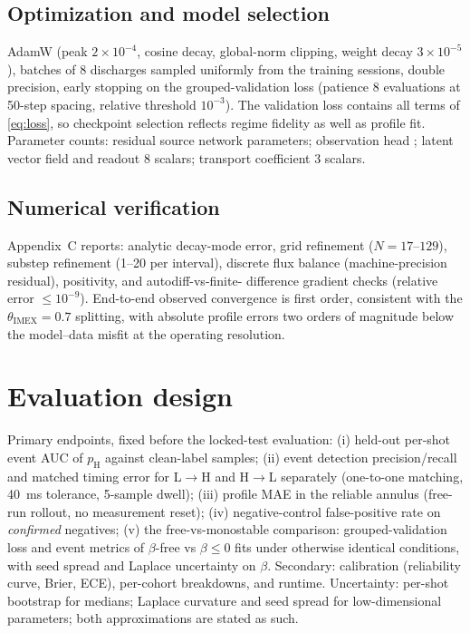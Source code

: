 \documentclass[11pt]{article}
\newcommand{\pH}{p_{\mathrm{H}}}
\newcommand{\thIMEX}{\theta_{\mathrm{IMEX}}}
\begin{document}
\subsection{Optimization and model selection}
AdamW (peak $2\times10^{-4}$, cosine decay, global-norm clipping,
weight decay $3\times10^{-5}$), batches of 8 discharges sampled uniformly
from the training sessions, double precision, early stopping on the
grouped-validation loss (patience 8 evaluations at 50-step spacing,
relative threshold $10^{-3}$). The validation loss contains all terms of
\eqref{eq:loss}, so checkpoint selection reflects regime fidelity as well
as profile fit. Parameter counts: residual source network
\resNsource{} parameters; observation head \resNhead{}; latent vector
field and readout 8 scalars; transport coefficient 3 scalars.

\subsection{Numerical verification}
Appendix~C reports: analytic decay-mode error, grid refinement
($N = 17$--$129$), substep refinement (1--20 per interval), discrete flux
balance (machine-precision residual), positivity, and autodiff-vs-finite-
difference gradient checks (relative error $\leq 10^{-9}$). End-to-end
observed convergence is first order, consistent with the
$\thIMEX = 0.7$ splitting, with absolute profile errors two orders of
magnitude below the model--data misfit at the operating resolution.



\section{Evaluation design}
\label{sec:evaldesign}

Primary endpoints, fixed before the locked-test evaluation:
(i) held-out per-shot event AUC of $\pH$ against clean-label samples;
(ii) event detection precision/recall and matched timing error for
L$\to$H and H$\to$L separately (one-to-one matching, \SI{40}{ms}
tolerance, 5-sample dwell);
(iii) profile MAE in the reliable annulus (free-run rollout, no
measurement reset);
(iv) negative-control false-positive rate on \emph{confirmed} negatives;
(v) the free-vs-monostable comparison: grouped-validation loss and event
metrics of $\beta$-free vs $\beta \leq 0$ fits under otherwise identical
conditions, with seed spread and Laplace uncertainty on $\beta$.
Secondary: calibration (reliability curve, Brier, ECE), per-cohort
breakdowns, and runtime. Uncertainty: per-shot bootstrap for medians;
Laplace curvature and seed spread for low-dimensional parameters; both
approximations are stated as such.
\end{document}
